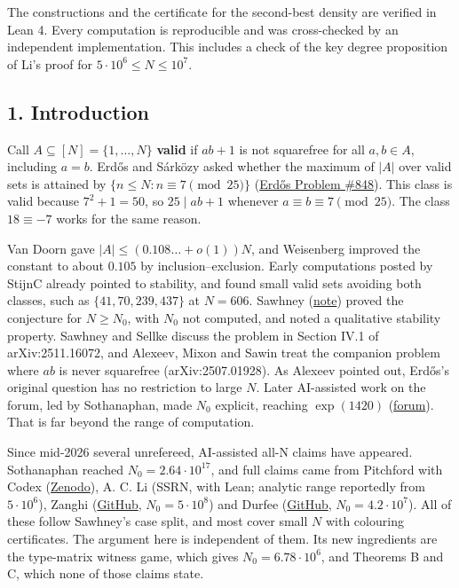 \documentclass[
  11pt,
]{article}
\begin{document}
The constructions and the certificate for the second-best density are
verified in Lean 4. Every computation is reproducible and was
cross-checked by an independent implementation. This includes a check of
the key degree proposition of Li's proof for
\(5\cdot 10^{6} \le N \le 10^{7}\).

\subsection{1. Introduction}

Call \(A \subseteq [N] = \{1, \dots, N\}\) \textbf{valid} if \(ab + 1\)
is not squarefree for all \(a, b \in A\), including \(a = b\). Erdős and
Sárközy asked whether the maximum of \(|A|\) over valid sets is attained
by \(\{n \le N : n \equiv 7 \pmod{25}\}\)
(\href{https://www.erdosproblems.com/848}{Erdős Problem \#848}). This
class is valid because \(7^2 + 1 = 50\), so \(25 \mid ab + 1\) whenever
\(a \equiv b \equiv 7 \pmod{25}\). The class \(18 \equiv -7\) works for
the same reason.

Van Doorn gave \(|A| \le (0.108\dots + o(1))N\), and Weisenberg improved
the constant to about \(0.105\) by inclusion--exclusion. Early
computations posted by StijnC already pointed to stability, and found
small valid sets avoiding both classes, such as \(\{41, 70, 239, 437\}\)
at \(N = 606\). Sawhney
(\href{https://www.math.columbia.edu/~msawhney/Problem_848.pdf}{note})
proved the conjecture for \(N \ge N_0\), with \(N_0\) not computed, and
noted a qualitative stability property. Sawhney and Sellke discuss the
problem in Section IV.1 of arXiv:2511.16072, and Alexeev, Mixon and
Sawin treat the companion problem where \(ab\) is never squarefree
(arXiv:2507.01928). As Alexeev pointed out, Erdős's original question
has no restriction to large \(N\). Later AI-assisted work on the forum,
led by Sothanaphan, made \(N_0\) explicit, reaching \(\exp(1420)\)
(\href{https://www.erdosproblems.com/forum/thread/848}{forum}). That is
far beyond the range of computation.

Since mid-2026 several unrefereed, AI-assisted all-N claims have
appeared. Sothanaphan reached \(N_0 = 2.64\cdot 10^{17}\), and full
claims came from Pitchford with Codex
(\href{https://zenodo.org/records/21647629}{Zenodo}), A. C. Li (SSRN,
with Lean; analytic range reportedly from \(5\cdot 10^{6}\)), Zanghi
(\href{https://github.com/bzanghi/erdos-848}{GitHub},
\(N_0 = 5\cdot 10^{8}\)) and Durfee
(\href{https://github.com/AstroCat93/erdos-848-verification}{GitHub},
\(N_0 = 4.2\cdot 10^{7}\)). All of these follow Sawhney's case split,
and most cover small \(N\) with colouring certificates. The argument
here is independent of them. Its new ingredients are the type-matrix
witness game, which gives \(N_0 = 6.78\cdot 10^{6}\), and Theorems B and
C, which none of those claims state.
\end{document}
